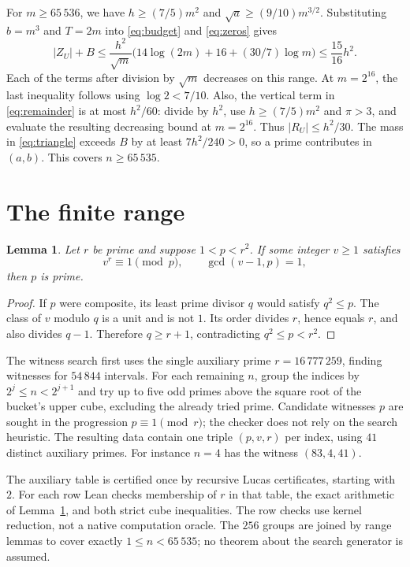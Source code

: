 \documentclass[10pt]{article}
\newtheorem{lemma}{Lemma}
\begin{document}
For \(m\ge65\,536\), we have \(h\ge(7/5)m^2\) and \(\sqrt a\ge(9/10)m^{3/2}\). Substituting \(b=m^3\) and \(T=2m\) into \eqref{eq:budget} and \eqref{eq:zeros} gives
\[
|Z_U|+B
 \le \frac{h^2}{\sqrt m}
 \bigl(14\log(2m)+16+(30/7)\log m\bigr)
 \le \frac{15}{16}h^2 .
\]
Each of the terms after division by \(\sqrt m\) decreases on this range. At \(m=2^{16}\), the last inequality follows using \(\log 2<7/10\). Also, the vertical term in \eqref{eq:remainder} is at most \(h^2/60\): divide by \(h^2\), use \(h\ge(7/5)m^2\) and \(\pi>3\), and evaluate the resulting decreasing bound at \(m=2^{16}\). Thus \(|R_U|\le h^2/30\). The mass in \eqref{eq:triangle} exceeds \(B\) by at least \(7h^2/240>0\), so a prime contributes in \((a,b)\). This covers \(n\ge65\,535\).

\section{The finite range}

\begin{lemma}\label{lem:cert}
Let \(r\) be prime and suppose \(1<p<r^2\). If some integer \(v\ge1\) satisfies
\[
v^r\equiv1\pmod p,\qquad \gcd(v-1,p)=1,
\]
then \(p\) is prime.
\end{lemma}
\begin{proof}
If \(p\) were composite, its least prime divisor \(q\) would satisfy \(q^2\le p\). The class of \(v\) modulo \(q\) is a unit and is not \(1\). Its order divides \(r\), hence equals \(r\), and also divides \(q-1\). Therefore \(q\ge r+1\), contradicting \(q^2\le p<r^2\).
\end{proof}

The witness search first uses the single auxiliary prime \(r=16\,777\,259\), finding witnesses for \(54\,844\) intervals. For each remaining \(n\), group the indices by \(2^j\le n<2^{j+1}\) and try up to five odd primes above the square root of the bucket's upper cube, excluding the already tried prime. Candidate witnesses \(p\) are sought in the progression \(p\equiv1\pmod r\); the checker does not rely on the search heuristic. The resulting data contain one triple \((p,v,r)\) per index, using \(41\) distinct auxiliary primes. For instance \(n=4\) has the witness \((83,4,41)\).

The auxiliary table is certified once by recursive Lucas certificates, starting with \(2\). For each row Lean checks membership of \(r\) in that table, the exact arithmetic of Lemma~\ref{lem:cert}, and both strict cube inequalities. The row checks use kernel reduction, not a native computation oracle. The \(256\) groups are joined by range lemmas to cover exactly \(1\le n<65\,535\); no theorem about the search generator is assumed.
\end{document}
